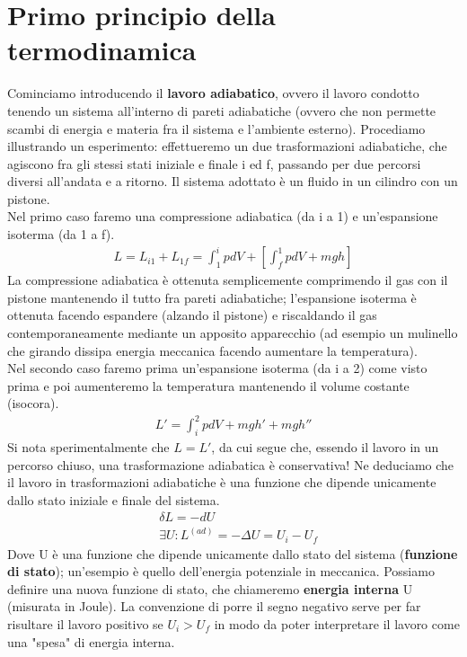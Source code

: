 \documentclass[
10pt, %
a4paper, %
oneside, %
headinclude,footinclude, %
BCOR5mm, %
]{scrartcl}
\begin{document}
\section{Primo principio della termodinamica}\label{sec:primo_principio}
Cominciamo introducendo il \textbf{lavoro adiabatico}, ovvero il lavoro condotto tenendo un sistema all'interno di pareti adiabatiche (ovvero che non permette scambi di energia e materia fra il sistema e l'ambiente esterno). Procediamo illustrando un esperimento: effettueremo un due trasformazioni adiabatiche, che agiscono fra gli stessi stati iniziale e finale i ed f, passando per due percorsi diversi all'andata e a ritorno. Il sistema adottato è un fluido in un cilindro con un pistone.\\
Nel primo caso faremo una compressione adiabatica (da i a 1) e un'espansione isoterma (da 1 a f). 
\begin{align*} 
	L = L_{i1}+L_{1f}= \int_{1}^{i}pdV +[\int_{f}^{1}pdV+mgh]
\end{align*} 
La compressione adiabatica è ottenuta semplicemente comprimendo il gas con il pistone mantenendo il tutto fra pareti adiabatiche; l'espansione isoterma è ottenuta facendo espandere (alzando il pistone) e riscaldando il gas contemporaneamente mediante un apposito apparecchio (ad esempio un mulinello che girando dissipa energia meccanica facendo aumentare la temperatura).\\
Nel secondo caso faremo prima un'espansione isoterma (da i a 2) come visto prima e poi aumenteremo la temperatura mantenendo il volume costante (isocora). 
\begin{align*} 
	L' = \int_{i}^{2}pdV+mgh'+mgh''
\end{align*} 
Si nota sperimentalmente che $L = L'$, da cui segue che, essendo il lavoro in un percorso chiuso, una trasformazione adiabatica è conservativa! Ne deduciamo che il lavoro in trasformazioni adiabatiche è una funzione che dipende unicamente dallo stato iniziale e finale del sistema. 
\begin{align*} 
	&\delta L = -dU\\
	&\exists U : L^{(ad)} = -\Delta U = U_i-U_f
\end{align*} 
Dove U è una funzione che dipende unicamente dallo stato del sistema (\textbf{funzione di stato}); un'esempio è quello dell'energia potenziale in meccanica.
Possiamo definire una nuova funzione di stato, che chiameremo \textbf{energia interna} U (misurata in Joule). La convenzione di porre il segno negativo serve per far risultare il lavoro positivo se $U_i>U_f$ in modo da poter interpretare il lavoro come una "spesa" di energia interna.\\
\end{document}
